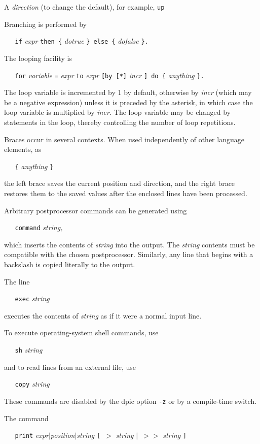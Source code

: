    A
{\it direction}
(to change the default), for example,
{\tt up}

Branching is performed by

{\tt \ \ \ if}
{\it expr}
{\tt then\ \{}
{\it dotrue}
{\tt \}\ else\ \{}
{\it dofalse}
{\tt \}.}

The looping facility is

{\tt \ \ \ for}
{\it variable}
{\tt =}
{\it expr}
{\tt to}
{\it expr}
{\tt [by\ [*]}
{\it incr}
{\tt ]\ do\ \{}
{\it anything}
{\tt \}.}

The loop variable is incremented by 1 by default, otherwise by
{\it incr}
(which may be a negative expression)
unless it is preceded by the asterisk, in which case the loop variable
is multiplied by
{\it incr.}
The loop variable may be changed by statements in the loop, thereby
controlling the number of loop repetitions.

Braces occur in several contexts.
When used independently of other language elements, as

{\tt \ \ \ \{}
{\it anything}
{\tt \}}

the left brace
saves the current position and direction, and the right brace restores
them to the saved values after the enclosed lines have been processed.

Arbitrary postprocessor commands can be generated using

{\tt \ \ \ command}
{\it string,}

which inserts the contents of
{\it string}
into the output.
The
{\it string}
contents must be compatible with the chosen postprocessor.
Similarly, any line that begins with a backslash is copied literally
to the output.

The line

{\tt \ \ \ exec}
{\it string}

executes the contents of
{\it string}
as if it were a normal input line.

To execute operating-system shell commands, use

{\tt \ \ \ sh}
{\it string}

and to read lines from an external file, use

{\tt \ \ \ copy}
{\it string}

These commands are disabled by the
dpic
option
{\tt -z}
or by a compile-time switch.

The command

{\tt \ \ \ print}
{\it expr$|$position$|$string}
{\tt [\ $>$}
{\it string}
{\tt $|$\ $>$$>$}
{\it string}
{\tt ]}

